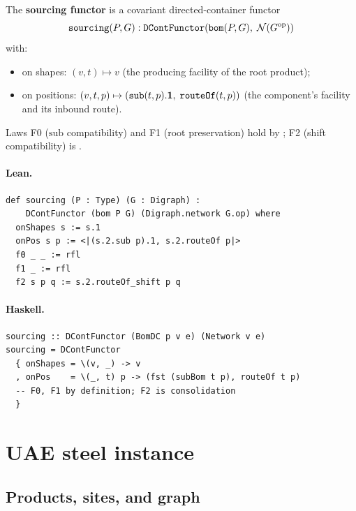 \documentclass[11pt,a4paper]{article}
\begin{document}
\begin{defn}
The \textbf{sourcing functor} is a covariant directed-container functor
\[
  \texttt{sourcing}(P, G) :
  \texttt{DContFunctor}(\texttt{bom}(P, G),\; \mathcal{N}(G^{\mathrm{op}}))
\]
with:
\begin{itemize}
  \item on shapes: $(v, t) \mapsto v$ (the producing facility of the root product);
  \item on positions: $(v, t, p) \mapsto (\texttt{sub}(t, p).\mathbf{1},\;
    \texttt{routeOf}(t, p))$ (the component's facility and its inbound route).
\end{itemize}
Laws F0 ($\mathrm{sub}$ compatibility) and F1 (root preservation) hold by
; F2 (shift compatibility) is .
\end{defn}

\paragraph{Lean.}
\begin{lstlisting}[style=lean]
def sourcing (P : Type) (G : Digraph) :
    DContFunctor (bom P G) (Digraph.network G.op) where
  onShapes s := s.1
  onPos s p := <|(s.2.sub p).1, s.2.routeOf p|>
  f0 _ _ := rfl
  f1 _ := rfl
  f2 s p q := s.2.routeOf_shift p q
\end{lstlisting}

\paragraph{Haskell.}
\begin{lstlisting}[style=haskell]
sourcing :: DContFunctor (BomDC p v e) (Network v e)
sourcing = DContFunctor
  { onShapes = \(v, _) -> v
  , onPos    = \(_, t) p -> (fst (subBom t p), routeOf t p)
  -- F0, F1 by definition; F2 is consolidation
  }
\end{lstlisting}


\section{UAE steel instance}

\subsection{Products, sites, and graph}
\end{document}
